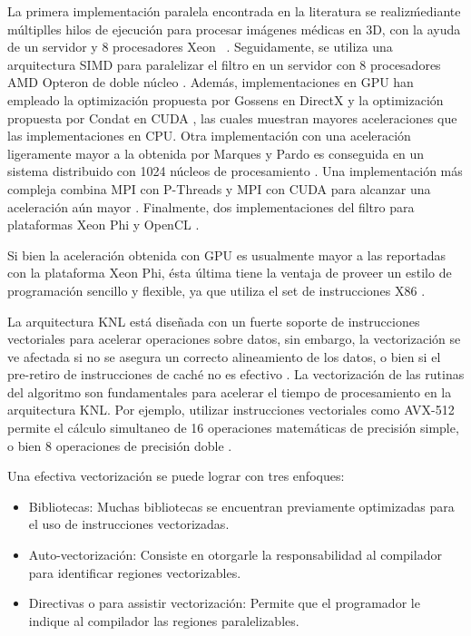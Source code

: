 La primera implementación paralela encontrada en la literatura se realiz\' mediante múltiplles hilos de ejecución para procesar imágenes médicas en 3D, con la ayuda de un servidor y 8 procesadores Xeon \ \cite{coupe2006fast}. Seguidamente, se utiliza una arquitectura SIMD para paralelizar el filtro en un servidor con 8 procesadores AMD Opteron de doble núcleo \cite{Darbon2008}. Además, implementaciones en GPU han empleado la optimización propuesta por Gossens en DirectX \cite{marques2013implementation} y la optimización propuesta por Condat en CUDA \cite{mingliang2016medical,goossens2010gpu}, las cuales muestran mayores aceleraciones que las implementaciones en CPU. Otra implementación con una aceleración ligeramente mayor a la obtenida por Marques y Pardo \cite{marques2013implementation} es conseguida en un sistema distribuido con 1024 núcleos de procesamiento \cite{shi2015optimized}. Una implementación más compleja combina MPI con P-Threads y MPI con CUDA para alcanzar una aceleración aún mayor \cite{nguyen2016medical}. Finalmente, dos implementaciones del filtro para plataformas Xeon Phi \cite{zhu2016parallel,huang2017parallel} y OpenCL \cite{zhu2016parallel}.

Si bien la aceleración obtenida con GPU es usualmente mayor a las reportadas con la plataforma Xeon Phi, ésta última tiene la ventaja de proveer un estilo de programación sencillo y flexible, ya que utiliza el set de instrucciones X86 \cite{huang2017parallel}. 

La arquitectura KNL está dise\~nada con un fuerte soporte de instrucciones vectoriales para acelerar operaciones sobre datos, sin embargo,  la vectorización se ve afectada si no se asegura un correcto alineamiento de los datos, o bien si el pre-retiro de instrucciones de caché no es efectivo \cite{Jeffers201617:vect}.
La vectorización de las rutinas del algoritmo son fundamentales para acelerar el tiempo de procesamiento en la arquitectura KNL. Por ejemplo, utilizar instrucciones vectoriales como AVX-512 permite el cálculo simultaneo de 16 operaciones matemáticas de precisión simple, o bien 8 operaciones de precisión doble \cite{Jeffers201617:vect}.

Una efectiva vectorización se puede lograr con tres enfoques:

\begin{itemize}
\item Bibliotecas: Muchas bibliotecas se encuentran previamente optimizadas para el uso de instrucciones vectorizadas. 
\item Auto-vectorización: Consiste en otorgarle la responsabilidad al compilador para identificar regiones vectorizables.
\item Directivas o  para assistir vectorización: Permite que el programador le indique al compilador las regiones paralelizables.
\end{itemize}
 
